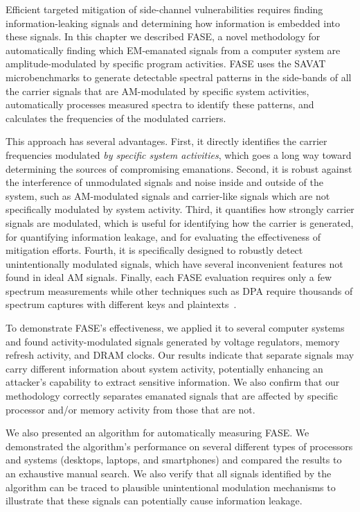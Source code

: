 Efficient targeted mitigation of side-channel vulnerabilities requires finding information-leaking signals and determining how information is embedded into these signals. In this chapter we described FASE, a novel methodology for automatically finding which EM-emanated signals from a computer system are amplitude-modulated by specific program activities. FASE uses the SAVAT microbenchmarks to generate detectable spectral patterns in the side-bands of all the carrier signals that are AM-modulated by specific system activities, automatically processes measured spectra to identify these patterns, and calculates the frequencies of the modulated carriers.

This approach has several advantages. First, it directly identifies the carrier frequencies modulated \textit{by specific system activities}, which goes a long way toward determining the sources of compromising emanations. Second, it is robust against the interference of unmodulated signals and noise inside and outside of the system, such as AM-modulated signals and carrier-like signals which are not specifically modulated by system activity. Third, it quantifies how strongly carrier signals are modulated, which is useful for identifying how the carrier is generated, for quantifying information leakage, and for evaluating the effectiveness of mitigation efforts. Fourth, it is specifically designed to robustly detect unintentionally modulated signals, which have several inconvenient features not found in ideal AM signals. Finally, each FASE evaluation requires only a few spectrum measurements while other techniques such as DPA require thousands of spectrum captures with different keys and plaintexts~\cite{sugawara2009}. 

To demonstrate FASE's effectiveness, we applied it to several computer systems and found activity-modulated signals generated by voltage regulators, memory refresh activity, and DRAM clocks. Our results indicate that separate signals may carry different information about system activity, potentially enhancing an attacker's capability to extract sensitive information. We also confirm that our methodology correctly separates emanated signals that are affected by specific processor and/or memory activity from those that are not.

We also presented an algorithm for automatically measuring FASE. We demonstrated the algorithm's performance on several different types of processors and systems (desktops, laptops, and smartphones) and compared the results to an exhaustive manual search. We also verify that all signals identified by the algorithm can be traced to plausible unintentional modulation mechanisms to illustrate that these signals can potentially cause information leakage. 

